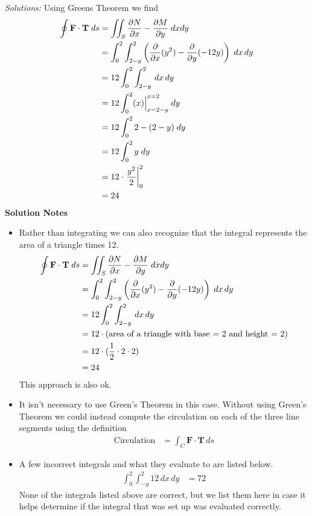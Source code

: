     \ifnum {} {\color{DarkBlue}  \textit{Solutions:} 
    Using Greens Theorem we find
    \begin{align*}
        \oint \mathbf F \cdot \mathbf{T} \;ds 
        &= \iint_S  \frac{\partial N}{ \partial x} - \frac{\partial M}{\partial y} \;dx dy 
        \\ 
        &= \int_0^2\int_{2-y}^{2}  \left( \frac{\partial}{\partial x} (y^2) - \frac{\partial}{\partial y}(-12y) \right) \;dx \, dy 
        \\ 
        &= 12 \int_0^2 \int_{2-y}^{2}  \, dx\, dy \\ 
        &= 12 \int_0^2 ( x )\Big\vert_{x=2-y}^{x=2} \;dy \\ 
        &= 12 \int_0^2 2 - (2-y)\;dy \\ 
        &= 12 \int_0^2 y \;dy \\ 
        &= 12 \cdot \left. \frac{y^2}{2} \right|_0^2 \\
        &= 24
    \end{align*}
        \textbf{Solution Notes}
    \begin{itemize}
        \item Rather than integrating we can also recognize that the integral represents the area of a triangle times 12. 
        \begin{align*}
            \oint \mathbf F \cdot \mathbf{T} \;ds 
            &= \iint_S  \frac{\partial N}{ \partial x} - \frac{\partial M}{\partial y} \;dx dy 
            \\ 
            &= \int_0^2\int_{2-y}^{2}  \left( \frac{\partial}{\partial x} (y^2) - \frac{\partial}{\partial y}(-12y) \right) \;dx \, dy 
            \\ 
            &= 12 \int_0^2 \int_{2-y}^{2}  \, dx\, dy \\ 
            &= 12 \cdot (\text{area of a triangle with base = 2 and height = 2}) \\ 
            &= 12 \cdot (\frac12 \cdot 2 \cdot 2) \\ 
            &= 24
        \end{align*}        
        This approach is also ok. 
        \item It isn't necessary to use Green's Theorem in this case. Without using Green's Theorem we could instead compute the circulation on each of the three line segments using the definition
    \begin{align}
        \text{Circulation} &= \int_C \mathbf F \cdot \mathbf T \, ds
    \end{align}
        \item A few incorrect integrals and what they evaluate to are listed below. 
        \begin{align}
            \int_0^{2} \int_{-y}^2 12 \, dx \, dy &= 72
        \end{align}
        None of the integrals listed above are correct, but we list them here in case it helps determine if the integral that was set up was evaluated correctly. 
    \end{itemize}
    
    } 
   \else
      
